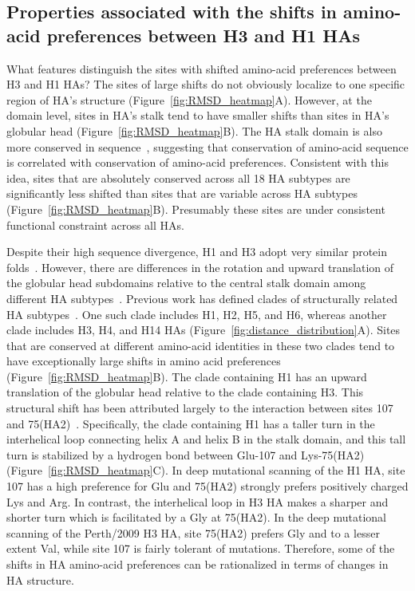 \documentclass[9pt,twocolumn,twoside]{pnas-new-for-biorxiv}
\begin{document}
\subsection*{Properties associated with the shifts in amino-acid preferences between H3 and H1 HAs}
What features distinguish the sites with shifted amino-acid preferences between H3 and H1 HAs?
The sites of large shifts do not obviously localize to one specific region of HA's structure (Figure~\ref{fig:RMSD_heatmap}A).
However, at the domain level, sites in HA's stalk tend to have smaller shifts than sites in HA's globular head (Figure~\ref{fig:RMSD_heatmap}B).
The HA stalk domain is also more conserved in sequence~\cite{nobusawa1991comparison}, suggesting that conservation of amino-acid sequence is correlated with conservation of amino-acid preferences.
Consistent with this idea, sites that are absolutely conserved across all 18 HA subtypes are significantly less shifted than sites that are variable across HA subtypes (Figure~\ref{fig:RMSD_heatmap}B).
Presumably these sites are under consistent functional constraint across all HAs.

Despite their high sequence divergence, H1 and H3 adopt very similar protein folds~\cite{ha2002h5,russell2004h1}.
However, there are differences in the rotation and upward translation of the globular head subdomains relative to the central stalk domain among different HA subtypes~\cite{ha2002h5,russell2004h1}.
Previous work has defined clades of structurally related HA subtypes~\cite{ha2002h5,russell2004h1}.
One such clade includes H1, H2, H5, and H6, whereas another clade includes H3, H4, and H14 HAs (Figure~\ref{fig:distance_distribution}A).
Sites that are conserved at different amino-acid identities in these two clades tend to have exceptionally large shifts in amino acid preferences (Figure~\ref{fig:RMSD_heatmap}B).
The clade containing H1 has an upward translation of the globular head relative to the clade containing H3.
This structural shift has been attributed largely to the interaction between sites 107 and 75(HA2)~\cite{ha2002h5,russell2004h1}.
Specifically, the clade containing H1 has a taller turn in the interhelical loop connecting helix A and helix B in the stalk domain, and this tall turn is stabilized by a hydrogen bond between Glu-107 and Lys-75(HA2) (Figure~\ref{fig:RMSD_heatmap}C).
In deep mutational scanning of the H1 HA, site 107 has a high preference for Glu and 75(HA2) strongly prefers positively charged Lys and Arg.
In contrast, the interhelical loop in H3 HA makes a sharper and shorter turn which is facilitated by a Gly at 75(HA2).
In the deep mutational scanning of the Perth/2009 H3 HA, site 75(HA2) prefers Gly and to a lesser extent Val, while site 107 is fairly tolerant of mutations.
Therefore, some of the shifts in HA amino-acid preferences can be rationalized in terms of changes in HA structure.
\end{document}
